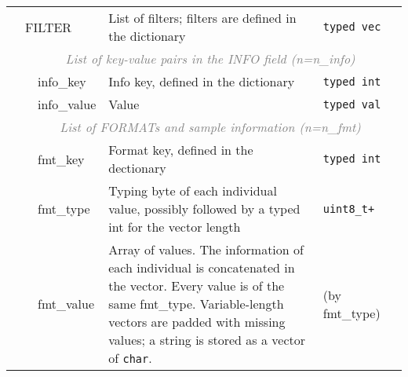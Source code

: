 \documentclass[10pt]{article}
\begin{document}
\begin{table}[ht]
{\begin{tabular}{|l|l|l|p{8.2cm}|l|r|}
  & \multicolumn{2}{l|}{\sf FILTER} & List of filters; filters are defined in the dictionary & {\tt typed vec} & \\\cline{2-6}
  & \multicolumn{5}{c|}{\textcolor{gray}{\it List of key-value pairs in the INFO field (n=n\_info)}} \\\cline{3-6}
  & & {\sf info\_key} & Info key, defined in the dictionary & {\tt typed int} & \\\cline{3-6}
  & & {\sf info\_value} & Value & {\tt typed val} &\\\cline{2-6}
  & \multicolumn{5}{c|}{\textcolor{gray}{\it List of FORMATs and sample information (n=n\_fmt)}} \\\cline{3-6}
  & & {\sf fmt\_key} & Format key, defined in the dectionary & {\tt typed int} & \\\cline{3-6}
  & & {\sf fmt\_type} & Typing byte of each individual value, possibly followed by a typed int for the vector length & {\tt uint8\_t+} & \\\cline{3-6}
  & & {\sf fmt\_value} & Array of values. The information of each individual is concatenated in the vector. Every value is of the same {\sf fmt\_type}.
    Variable-length vectors are padded with missing values; a string is stored as a vector of {\tt char}. & (by {\sf fmt\_type}) &\\
  \cline{1-6}
\end{tabular}}
\end{table}
\end{document}
